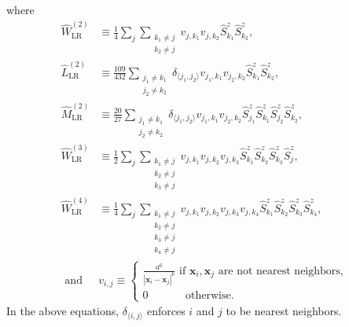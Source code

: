 \documentclass[twocolumn,superscriptaddress,amsmath,amssymb,aps,prx,nofootinbib]{revtex4-2}
\begin{document}
where 
\begin{align}
    \hat{W}^{(2)}_{\text{LR}}&\equiv \frac{1}{4}\sum_{j} \sum_{\substack{k_1\neq j \\ k_2\neq j}}v_{j,k_1} v_{j, k_2}\hat{S}^z_{k_1}\hat{S}^z_{k_2},\\
    \hat{L}^{(2)}_{\text{LR}}&\equiv \frac{109}{432}\sum_{\substack{j_1 \neq k_1 \\ j_2 \neq k_2}}\delta_{\langle j_1, j_2 \rangle}  v_{j_1,k_1} v_{j_2, k_2} \hat{S}^z_{k_1}\hat{S}^z_{k_2}, \\
    \hat{M}^{(2)}_{\text{LR}}&\equiv \frac{20}{27} \sum_{\substack{j_1 \neq k_1 \\ j_2 \neq k_2}}\delta_{\langle j_1, j_2 \rangle}  v_{j_1,k_1} v_{j_2, k_2} \hat{S}^z_{j_1}\hat{S}^z_{k_1}\hat{S}^z_{j_2}\hat{S}^z_{k_2}, \\
    \hat{W}^{(3)}_{\text{LR}}&\equiv \frac{1}{2}\sum_{j}\sum_{\substack{k_1 \neq j \\ k_2 \neq j \\ k_3 \neq j}}v_{j,k_1}v_{j, k_2} v_{j, k_3}\hat{S}^z_{k_1}\hat{S}^z_{k_2}\hat{S}^z_{k_3}\hat{S}^z_{j},\\
    \hat{W}^{(4)}_{\text{LR}}&\equiv \frac{1}{4}\sum_{j}\sum_{\substack{k_1 \neq j \\ k_2 \neq j \\ k_3 \neq j \\k_4 \neq j}}v_{j,k_1}v_{j, k_2} v_{j, k_3}v_{j, k_4}\hat{S}^z_{k_1}\hat{S}^z_{k_2}\hat{S}^z_{k_3}\hat{S}^z_{k_4},\\
    \text{ and } &v_{i,j} \equiv \begin{cases}\frac{a^6}{\left|\bm{x}_i - \bm{x}_j\right|^6} \text{ if }\bm{x}_i, \bm{x}_j \text{ are not nearest neighbors,}\\0 \;\;\;\;\;\;\;\;\;\;\;\text{ otherwise.}\end{cases}
\end{align}
In the above equations, $\delta_{\langle i,j \rangle}$ enforces $i$ and $j$ to be nearest neighbors.
\end{document}
